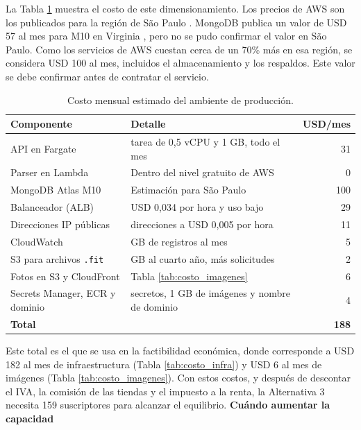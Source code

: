 La Tabla \ref{tab:costo_produccion} muestra el costo de este dimensionamiento. Los precios de AWS son los publicados para la región de São Paulo \citep{aws_fargate_pricing}. MongoDB publica un valor de USD 57 al mes para M10 en Virginia \citep{atlas_pricing}, pero no se pudo confirmar el valor en São Paulo. Como los servicios de AWS cuestan cerca de un 70\% más en esa región, se considera USD 100 al mes, incluidos el almacenamiento y los respaldos. Este valor se debe confirmar antes de contratar el servicio.

\begin{table}[h!]
    \centering
    \renewcommand{\arraystretch}{1.25}
    \footnotesize
    \begin{tabular}{|>{\raggedright\arraybackslash}p{5cm}|>{\raggedright\arraybackslash}p{7.5cm}|r|}
        \hline
        \rowcolor[HTML]{EFEFEF}
        \textbf{Componente} & \textbf{Detalle} & \textbf{USD/mes} \\ \hline
        API en Fargate & 1 tarea de 0,5 vCPU y 1 GB, todo el mes & 31 \\ \hline
        Parser en Lambda & Dentro del nivel gratuito de AWS & 0 \\ \hline
        MongoDB Atlas M10 & Estimación para São Paulo & 100 \\ \hline
        Balanceador (ALB) & USD 0,034 por hora y uso bajo & 29 \\ \hline
        Direcciones IP públicas & 3 direcciones a USD 0,005 por hora & 11 \\ \hline
        CloudWatch & 5 GB de registros al mes & 5 \\ \hline
        S3 para archivos \texttt{.fit} & 29 GB al cuarto año, más solicitudes & 2 \\ \hline
        Fotos en S3 y CloudFront & Tabla \ref{tab:costo_imagenes} & 6 \\ \hline
        Secrets Manager, ECR y dominio & 6 secretos, 1 GB de imágenes y nombre de dominio & 4 \\ \hline
        \rowcolor[HTML]{E8F5E9}
        \textbf{Total} &  & \textbf{188} \\ \hline
    \end{tabular}
    \caption{Costo mensual estimado del ambiente de producción.}
    \label{tab:costo_produccion}
\end{table}

Este total es el que se usa en la factibilidad económica, donde corresponde a USD 182 al mes de infraestructura (Tabla \ref{tab:costo_infra}) y USD 6 al mes de imágenes (Tabla \ref{tab:costo_imagenes}). Con estos costos, y después de descontar el IVA, la comisión de las tiendas y el impuesto a la renta, la Alternativa 3 necesita 159 suscriptores para alcanzar el equilibrio.
\newpage
\textbf{Cuándo aumentar la capacidad}

